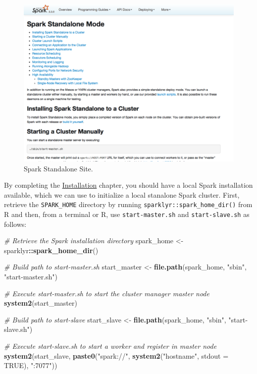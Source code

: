 \documentclass[]{book}
\newenvironment{Shaded}{\begin{snugshade}}{\end{snugshade}}
\newcommand{\CommentTok}[1]{\textcolor[rgb]{0.56,0.35,0.01}{\textit{#1}}}
\newcommand{\DataTypeTok}[1]{\textcolor[rgb]{0.13,0.29,0.53}{#1}}
\newcommand{\KeywordTok}[1]{\textcolor[rgb]{0.13,0.29,0.53}{\textbf{#1}}}
\newcommand{\NormalTok}[1]{#1}
\newcommand{\OperatorTok}[1]{\textcolor[rgb]{0.81,0.36,0.00}{\textbf{#1}}}
\newcommand{\OtherTok}[1]{\textcolor[rgb]{0.56,0.35,0.01}{#1}}
\newcommand{\StringTok}[1]{\textcolor[rgb]{0.31,0.60,0.02}{#1}}
\theoremstyle{definition}
\theoremstyle{definition}
\theoremstyle{definition}
\theoremstyle{remark}
\begin{document}
\begin{figure}

{\centering \includegraphics[width=13.78in]{images/05-clusters-spark-standalone} 

}

\caption{Spark Standalone Site.}\label{fig:spark-standalone}
\end{figure}

By completing the \protect\hyperlink{installation}{Installation}
chapter, you should have a local Spark installation available, which we
can use to initialize a local stanalone Spark cluster. First, retrieve
the \texttt{SPARK\_HOME} directory by running
\texttt{sparklyr::spark\_home\_dir()} from R and then, from a terminal
or R, use \texttt{start-master.sh} and \texttt{start-slave.sh} as
follows:

\begin{Shaded}
\begin{Highlighting}[]
\CommentTok{# Retrieve the Spark installation directory}
\NormalTok{spark_home <-}\StringTok{ }\NormalTok{sparklyr}\OperatorTok{::}\KeywordTok{spark_home_dir}\NormalTok{()}

\CommentTok{# Build path to start-master.sh}
\NormalTok{start_master <-}\StringTok{ }\KeywordTok{file.path}\NormalTok{(spark_home, }\StringTok{"sbin"}\NormalTok{, }\StringTok{"start-master.sh"}\NormalTok{)}

\CommentTok{# Execute start-master.sh to start the cluster manager master node}
\KeywordTok{system2}\NormalTok{(start_master)}

\CommentTok{# Build path to start-slave}
\NormalTok{start_slave <-}\StringTok{ }\KeywordTok{file.path}\NormalTok{(spark_home, }\StringTok{"sbin"}\NormalTok{, }\StringTok{"start-slave.sh"}\NormalTok{)}

\CommentTok{# Execute start-slave.sh to start a worker and register in master node}
\KeywordTok{system2}\NormalTok{(start_slave, }\KeywordTok{paste0}\NormalTok{(}\StringTok{"spark://"}\NormalTok{, }\KeywordTok{system2}\NormalTok{(}\StringTok{"hostname"}\NormalTok{, }\DataTypeTok{stdout =} \OtherTok{TRUE}\NormalTok{), }\StringTok{":7077"}\NormalTok{))}
\end{Highlighting}
\end{Shaded}
\end{document}
